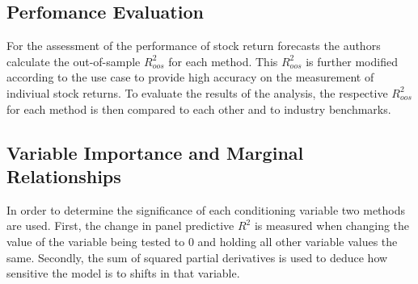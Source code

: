 \subsection{Perfomance Evaluation}
For the assessment of the performance of stock return forecasts the authors calculate the out-of-sample $R^{2}_{oos}$ for each method.
This $R^{2}_{oos}$ is further modified according to the use case to provide high accuracy on the measurement of indiviual stock returns.
To evaluate the results of the analysis, the respective $R^{2}_{oos}$ for each method is then compared to each other and to industry benchmarks.

\subsection{Variable Importance and Marginal Relationships}
In order to determine the significance of each conditioning variable two methods are used. First, the change in panel predictive $R^{2}$ is measured when changing the value of the variable being tested to 0 and holding all other variable values the same. Secondly, the sum of squared partial derivatives is used to deduce how sensitive the model is to shifts in that variable.